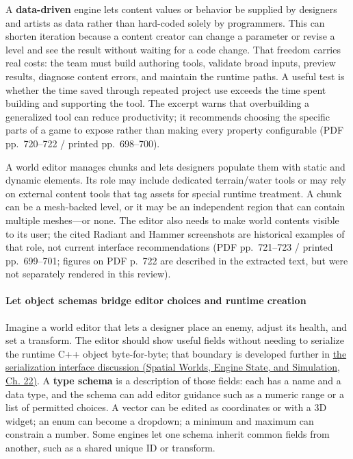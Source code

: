 A \textbf{data-driven} engine lets content values or behavior be supplied by designers and artists as data rather than hard-coded solely by programmers. This can shorten iteration because a content creator can change a parameter or revise a level and see the result without waiting for a code change. That freedom carries real costs: the team must build authoring tools, validate broad inputs, preview results, diagnose content errors, and maintain the runtime paths. A useful test is whether the time saved through repeated project use exceeds the time spent building and supporting the tool. The excerpt warns that overbuilding a generalized tool can reduce productivity; it recommends choosing the specific parts of a game to expose rather than making every property configurable (PDF pp.~720--722 / printed pp.~698--700).

A world editor manages chunks and lets designers populate them with static and dynamic elements. Its role may include dedicated terrain/water tools or may rely on external content tools that tag assets for special runtime treatment. A chunk can be a mesh-backed level, or it may be an independent region that can contain multiple meshes---or none. The editor also needs to make world contents visible to its user; the cited Radiant and Hammer screenshots are historical examples of that role, not current interface recommendations (PDF pp.~721--723 / printed pp.~699--701; figures on PDF p.~722 are described in the extracted text, but were not separately rendered in this review).

\paragraph{Let object schemas bridge editor choices and runtime creation}\label{06-engine-ii-ch032-let-object-schemas-bridge-editor-choices-and-runtime-creation}

Imagine a world editor that lets a designer place an enemy, adjust its health, and set a transform. The editor should show useful fields without needing to serialize the runtime C++ object byte-for-byte; that boundary is developed further in \href{../05-Spatial-Worlds-Engine-State-and-Simulation/main.pdf\#nameddest=06-engine-ii-ch033-serialization-is-an-interface-between-tools-and-execution}{the serialization interface discussion (Spatial Worlds, Engine State, and Simulation, Ch. 22)}. A \textbf{type schema} is a description of those fields: each has a name and a data type, and the schema can add editor guidance such as a numeric range or a list of permitted choices. A vector can be edited as coordinates or with a 3D widget; an enum can become a dropdown; a minimum and maximum can constrain a number. Some engines let one schema inherit common fields from another, such as a shared unique ID or transform.

